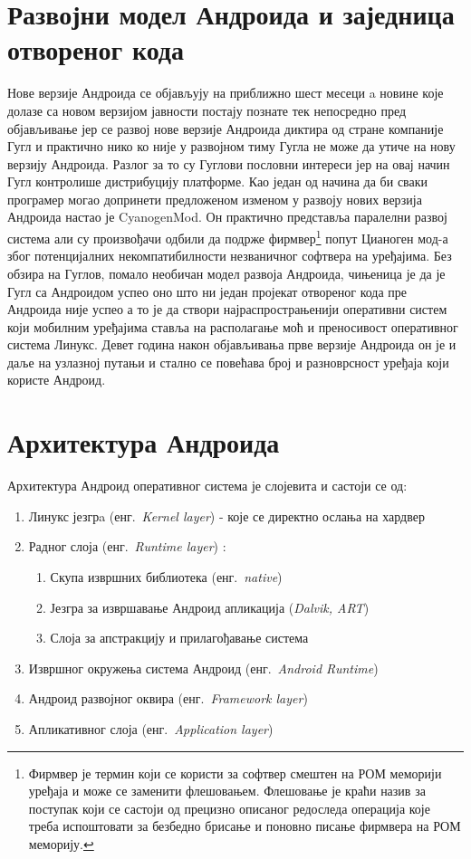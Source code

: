 \documentclass[12pt,oneside]{memoir}
\theoremstyle{remark}
\begin{document}
\section{Развојни модел Андроида и заједница отвореног кода}
Нове верзије Андроида се објављују на приближно шест месеци a новине које долазе са новом верзијом јавности постају познате тек непосредно пред објављивање јер се развој нове верзије Андроида диктира од стране компаније Гугл и практично нико ко није у развојном тиму Гугла не може да утиче на нову верзију Андроида. Разлог за то су Гуглови пословни интереси јер на овај начин Гугл контролише дистрибуцију платформе. Као један од начина да би сваки програмер могао допринети предложеном изменом у развоју нових верзија Андроида настао је CyanogenMod. Он практично представља паралелни развој система али су произвођачи одбили да подрже фирмвер\footnote{Фирмвер је термин који се користи за софтвер смештен на РОМ меморији уређаја и може се заменити флешовањем. Флешовање је краћи назив за поступак који се састоји од прецизно описаног редоследа операција које треба испоштовати за безбедно брисање и поновно писање фирмвера на РОМ меморију.} попут Цианоген мод-а због потенцијалних некомпатибилности незваничног софтвера на уређајима.  Без обзира на Гуглов, помало необичан модел развоја Андроида, чињеница је да је Гугл са Андроидом успео оно што ни један пројекат отвореног кода пре Андроида није успео а то је да створи најраспрострањенији оперативни систем који мобилним уређајима  ставља на располагање моћ и преносивост оперативног система Линукс. Девет година након објављивања прве верзије Андроида он је и даље на узлазној путањи и стално се повећава број и разноврсност уређаја који користе Андроид. 


\section{Архитектура Андроида}
Архитектура Андроид оперативног система је слојевита и састоји се од:
\begin{enumerate}
\item Линукс језгрa (енг.~{\em Kernel layer}) - које се директно ослања на хардвер
\item Радног слоја (енг.~{\em Runtime layer}) :
\begin{enumerate}
\item Скупа извршних библиотека  (енг.~{\em native})
\item Језгра за извршавање Андроид апликација  ({\em Dalvik, ART})
\item Слоја за апстракцију и прилагођавање система
\end{enumerate}

\item Извршног окружења система Андроид (енг.~{\em Android Runtime})
\item Андроид развојног оквира (енг.~{\em Framework layer}) 
\item Апликативног слоја (енг.~{\em Application layer})
\end{enumerate}
\end{document}
